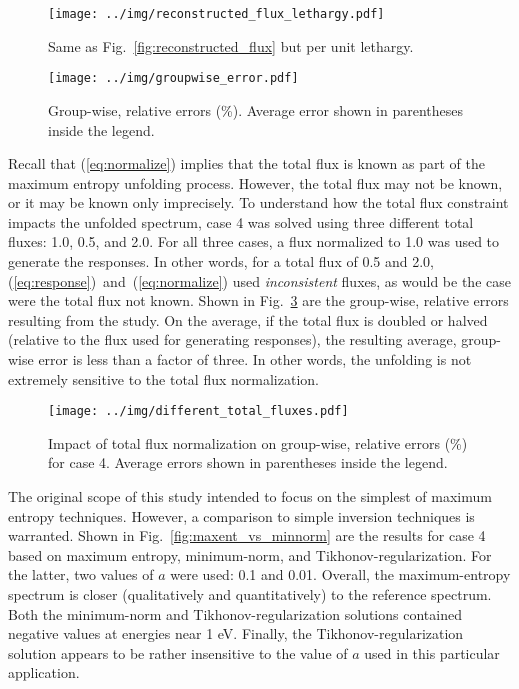 \documentclass[journal]{IEEEtran}
\newcommand{\FIG}[1]{Fig.~\ref{#1}}               %
\begin{document}
\begin{figure}[h!tb]
  \centering
  \texttt{[image: ../img/reconstructed\_flux\_lethargy.pdf]}
  \caption{Same as \FIG{fig:reconstructed_flux} but per unit lethargy.}
  \label{fig:reconstructed_flux_lethargy}
\end{figure}

\begin{figure}[h!tb]
  \centering
  \texttt{[image: ../img/groupwise\_error.pdf]}
  \caption{Group-wise, relative errors (\%).  Average error shown in parentheses inside the legend.}
  \label{fig:error}
\end{figure}


Recall that (\ref{eq:normalize}) implies that the total flux is known as part of the maximum entropy unfolding process.  However, the total flux may not be known, or it may be known only imprecisely.  To understand how the total flux constraint impacts the unfolded spectrum, case 4 was solved using three different total fluxes: 1.0, 0.5, and 2.0.  For all three cases, a flux normalized to 1.0 was used to generate the responses.  In other words, for a total flux of 0.5 and 2.0, (\ref{eq:response})~and~(\ref{eq:normalize}) used {\it inconsistent} fluxes, as would be the case were the total flux not known.  Shown in \FIG{fig:different_total_fluxes} are the group-wise, relative errors resulting from the study.  On the average, if the total flux is doubled or halved (relative to the flux used for generating responses), the resulting average, group-wise error is less than a factor of three.  In other words, the unfolding is not extremely sensitive to the total flux normalization.

\begin{figure}[h!tb]
  \centering
  \texttt{[image: ../img/different\_total\_fluxes.pdf]}
  \caption{Impact of total flux normalization on group-wise, relative errors (\%) for case 4.  Average  errors shown in parentheses inside the legend.}
  \label{fig:different_total_fluxes}
\end{figure}

The original scope of this study intended to focus on the simplest of maximum entropy techniques.  However, a comparison to simple inversion techniques is warranted.  Shown in \FIG{fig:maxent_vs_minnorm} are the results for case 4 based on maximum entropy, minimum-norm, and Tikhonov-regularization.  For the latter, two values of $a$ were used: 0.1 and 0.01.  Overall, the maximum-entropy spectrum is closer (qualitatively and quantitatively) to the reference spectrum.  Both the minimum-norm and Tikhonov-regularization solutions contained negative values at energies near 1 eV.  Finally, the Tikhonov-regularization solution appears to be rather insensitive to the value of $a$ used in this particular application.  
\end{document}

